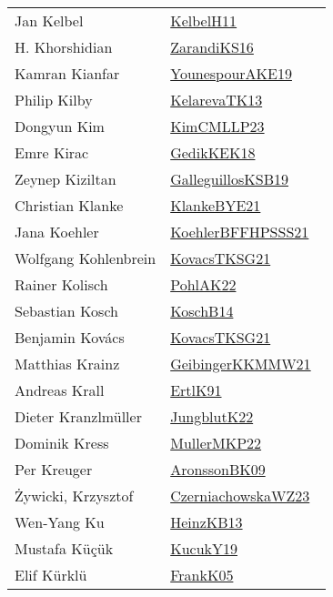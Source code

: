 {\begin{longtable}{p{4cm}p{20cm}}
Jan Kelbel & \href{works/KelbelH11.pdf}{KelbelH11}~\cite{KelbelH11}\\
H. Khorshidian & \href{works/ZarandiKS16.pdf}{ZarandiKS16}~\cite{ZarandiKS16}\\
Kamran Kianfar & \href{works/YounespourAKE19.pdf}{YounespourAKE19}~\cite{YounespourAKE19}\\
Philip Kilby & \href{works/KelarevaTK13.pdf}{KelarevaTK13}~\cite{KelarevaTK13}\\
Dongyun Kim & \href{works/KimCMLLP23.pdf}{KimCMLLP23}~\cite{KimCMLLP23}\\
Emre Kirac & \href{works/GedikKEK18.pdf}{GedikKEK18}~\cite{GedikKEK18}\\
Zeynep Kiziltan & \href{works/GalleguillosKSB19.pdf}{GalleguillosKSB19}~\cite{GalleguillosKSB19}\\
Christian Klanke & \href{works/KlankeBYE21.pdf}{KlankeBYE21}~\cite{KlankeBYE21}\\
Jana Koehler & \href{works/KoehlerBFFHPSSS21.pdf}{KoehlerBFFHPSSS21}~\cite{KoehlerBFFHPSSS21}\\
Wolfgang Kohlenbrein & \href{works/KovacsTKSG21.pdf}{KovacsTKSG21}~\cite{KovacsTKSG21}\\
Rainer Kolisch & \href{works/PohlAK22.pdf}{PohlAK22}~\cite{PohlAK22}\\
Sebastian Kosch & \href{works/KoschB14.pdf}{KoschB14}~\cite{KoschB14}\\
Benjamin Kov{\'{a}}cs & \href{works/KovacsTKSG21.pdf}{KovacsTKSG21}~\cite{KovacsTKSG21}\\
Matthias Krainz & \href{works/GeibingerKKMMW21.pdf}{GeibingerKKMMW21}~\cite{GeibingerKKMMW21}\\
Andreas Krall & \href{works/ErtlK91.pdf}{ErtlK91}~\cite{ErtlK91}\\
Dieter Kranzlm{\"{u}}ller & \href{works/JungblutK22.pdf}{JungblutK22}~\cite{JungblutK22}\\
Dominik Kress & \href{works/MullerMKP22.pdf}{MullerMKP22}~\cite{MullerMKP22}\\
Per Kreuger & \href{works/AronssonBK09.pdf}{AronssonBK09}~\cite{AronssonBK09}\\
Żywicki, Krzysztof & \href{works/CzerniachowskaWZ23.pdf}{CzerniachowskaWZ23}~\cite{CzerniachowskaWZ23}\\
Wen{-}Yang Ku & \href{works/HeinzKB13.pdf}{HeinzKB13}~\cite{HeinzKB13}\\
Mustafa K{\"u}ç{\"u}k & \href{works/KucukY19.pdf}{KucukY19}~\cite{KucukY19}\\
Elif K{\"{u}}rkl{\"{u}} & \href{works/FrankK05.pdf}{FrankK05}~\cite{FrankK05}\\

\end{longtable}}
